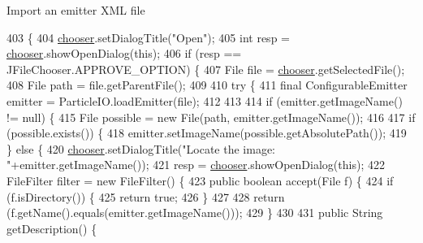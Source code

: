 Import an emitter X\+ML file 
\begin{DoxyCode}
403                                 \{
404         \mbox{\hyperlink{classorg_1_1newdawn_1_1slick_1_1tools_1_1peditor_1_1_particle_editor_a7a921beab5e50d8482810cf42136ee17}{chooser}}.setDialogTitle(\textcolor{stringliteral}{"Open"});
405         \textcolor{keywordtype}{int} resp = \mbox{\hyperlink{classorg_1_1newdawn_1_1slick_1_1tools_1_1peditor_1_1_particle_editor_a7a921beab5e50d8482810cf42136ee17}{chooser}}.showOpenDialog(\textcolor{keyword}{this});
406         \textcolor{keywordflow}{if} (resp == JFileChooser.APPROVE\_OPTION) \{
407             File file = \mbox{\hyperlink{classorg_1_1newdawn_1_1slick_1_1tools_1_1peditor_1_1_particle_editor_a7a921beab5e50d8482810cf42136ee17}{chooser}}.getSelectedFile();
408             File path = file.getParentFile();
409             
410             \textcolor{keywordflow}{try} \{
411                 \textcolor{keyword}{final} ConfigurableEmitter emitter = ParticleIO.loadEmitter(file);
412                 
413                 
414                 \textcolor{keywordflow}{if} (emitter.getImageName() != null) \{
415                     File possible = \textcolor{keyword}{new} File(path, emitter.getImageName());
416                     
417                     \textcolor{keywordflow}{if} (possible.exists()) \{
418                         emitter.setImageName(possible.getAbsolutePath());
419                     \} \textcolor{keywordflow}{else} \{
420                         \mbox{\hyperlink{classorg_1_1newdawn_1_1slick_1_1tools_1_1peditor_1_1_particle_editor_a7a921beab5e50d8482810cf42136ee17}{chooser}}.setDialogTitle(\textcolor{stringliteral}{"Locate the image: "}+emitter.getImageName());
421                         resp = \mbox{\hyperlink{classorg_1_1newdawn_1_1slick_1_1tools_1_1peditor_1_1_particle_editor_a7a921beab5e50d8482810cf42136ee17}{chooser}}.showOpenDialog(\textcolor{keyword}{this});
422                         FileFilter filter = \textcolor{keyword}{new} FileFilter() \{
423                             \textcolor{keyword}{public} \textcolor{keywordtype}{boolean} accept(File f) \{
424                                 \textcolor{keywordflow}{if} (f.isDirectory()) \{
425                                     \textcolor{keywordflow}{return} \textcolor{keyword}{true};
426                                 \}
427                                 
428                                 \textcolor{keywordflow}{return} (f.getName().equals(emitter.getImageName()));
429                             \}
430     
431                             \textcolor{keyword}{public} String getDescription() \{

\end{DoxyCode}
